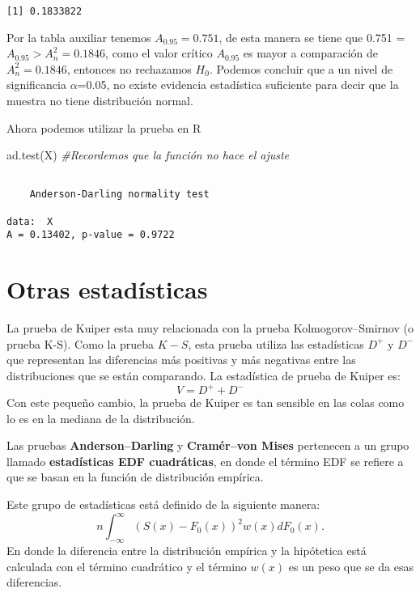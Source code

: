 \documentclass[
  a4paper,
  oneside,
  openany]{book}
\newenvironment{Shaded}{\begin{snugshade}}{\end{snugshade}}
\newcommand{\CommentTok}[1]{\textcolor[rgb]{0.56,0.35,0.01}{\textit{#1}}}
\newcommand{\FunctionTok}[1]{\textcolor[rgb]{0.00,0.00,0.00}{#1}}
\newcommand{\NormalTok}[1]{#1}
\begin{document}
\begin{verbatim}
[1] 0.1833822
\end{verbatim}

Por la tabla auxiliar tenemos \(A_{0.95}=0.751\), de esta manera se tiene que 0.751 = \(A_{0.95} > A_{n}^2=0.1846\), como el valor crítico \(A_{0.95}\) es mayor a comparación de \(A_{n}^2=0.1846\), entonces no rechazamos \(H_0\). Podemos concluir que a un nivel de significancia \(\alpha\)=0.05, no existe evidencia estadística suficiente para decir que la muestra no tiene distribución normal.

\break

Ahora podemos utilizar la prueba en R

\begin{Shaded}
\begin{Highlighting}[]
\FunctionTok{ad.test}\NormalTok{(X)   }\CommentTok{\#Recordemos que la función no hace el ajuste}
\end{Highlighting}
\end{Shaded}

\begin{verbatim}

    Anderson-Darling normality test

data:  X
A = 0.13402, p-value = 0.9722
\end{verbatim}

\hypertarget{otras-estaduxedsticas}{%
\chapter{Otras estadísticas}\label{otras-estaduxedsticas}}

La prueba de Kuiper esta muy relacionada con la prueba Kolmogorov--Smirnov (o prueba K-S). Como la prueba \(K-S\), esta prueba utiliza las estadísticas \(D^+\) y \(D^-\) que representan las diferencias más positivas y más negativas entre las distribuciones que se están comparando. La estadística de prueba de Kuiper es:
\[V=D^+ + D^-\]
Con este pequeño cambio, la prueba de Kuiper es tan sensible en las colas como lo es en la mediana de la distribución.

Las pruebas \textbf{Anderson--Darling} y \textbf{Cramér--von Mises} pertenecen a un grupo llamado \textbf{estadísticas EDF cuadráticas}, en donde el término EDF se refiere a que se basan en la función de distribución empírica.

Este grupo de estadísticas está definido de la siguiente manera:
\[n\int_{-\infty}^{\infty}(S(x)-F_0(x))^2w(x)dF_0(x).\]
En donde la diferencia entre la distribución empírica y la hipótetica está calculada con el término cuadrático y el término \(w(x)\) es un peso que se da esas diferencias.
\end{document}
